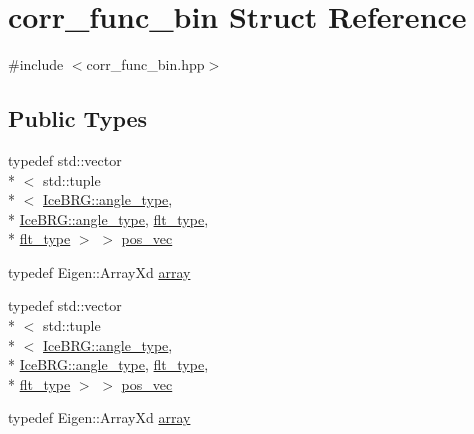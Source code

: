 \hypertarget{structcorr__func__bin}{\section{corr\-\_\-func\-\_\-bin Struct Reference}
\label{structcorr__func__bin}
}


{\ttfamily \#include $<$corr\-\_\-func\-\_\-bin.\-hpp$>$}

\subsection*{Public Types}
\begin{DoxyCompactItemize}
\item 
typedef std\-::vector\\*
$<$ std\-::tuple\\*
$<$ \hyperlink{namespaceIceBRG_a688eeb0811a2474b20b667ed2e9625a1}{Ice\-B\-R\-G\-::angle\-\_\-type}, \\*
\hyperlink{namespaceIceBRG_a688eeb0811a2474b20b667ed2e9625a1}{Ice\-B\-R\-G\-::angle\-\_\-type}, \hyperlink{lib_2IceBRG__main_2common_8h_ad0f130a56eeb944d9ef2692ee881ecc4}{flt\-\_\-type}, \\*
\hyperlink{lib_2IceBRG__main_2common_8h_ad0f130a56eeb944d9ef2692ee881ecc4}{flt\-\_\-type} $>$ $>$ \hyperlink{structcorr__func__bin_a683c7075740b3dcae9ebb1ac758c0bfa}{pos\-\_\-vec}
\item 
typedef Eigen\-::\-Array\-Xd \hyperlink{structcorr__func__bin_a266e654606807bf423b915c6ef9ff7ab}{array}
\item 
typedef std\-::vector\\*
$<$ std\-::tuple\\*
$<$ \hyperlink{namespaceIceBRG_a688eeb0811a2474b20b667ed2e9625a1}{Ice\-B\-R\-G\-::angle\-\_\-type}, \\*
\hyperlink{namespaceIceBRG_a688eeb0811a2474b20b667ed2e9625a1}{Ice\-B\-R\-G\-::angle\-\_\-type}, \hyperlink{lib_2IceBRG__main_2common_8h_ad0f130a56eeb944d9ef2692ee881ecc4}{flt\-\_\-type}, \\*
\hyperlink{lib_2IceBRG__main_2common_8h_ad0f130a56eeb944d9ef2692ee881ecc4}{flt\-\_\-type} $>$ $>$ \hyperlink{structcorr__func__bin_a683c7075740b3dcae9ebb1ac758c0bfa}{pos\-\_\-vec}
\item 
typedef Eigen\-::\-Array\-Xd \hyperlink{structcorr__func__bin_a266e654606807bf423b915c6ef9ff7ab}{array}
\end{DoxyCompactItemize}
